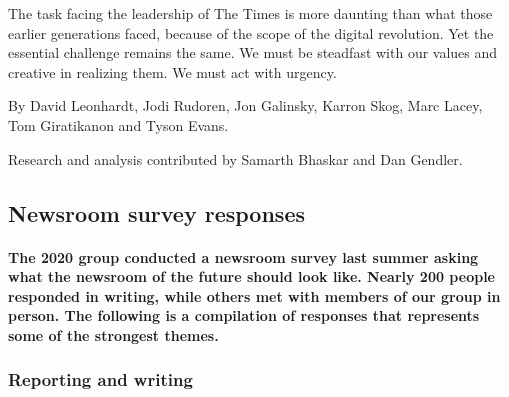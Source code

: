 The task facing the leadership of The Times is more daunting than what
those earlier generations faced, because of the scope of the digital
revolution. Yet the essential challenge remains the same. We must be
steadfast with our values and creative in realizing them. We must act
with urgency.

By David Leonhardt, Jodi Rudoren, Jon Galinsky, Karron Skog, Marc Lacey,
Tom Giratikanon and Tyson Evans.

Research and analysis contributed by Samarth Bhaskar and Dan Gendler.

\hypertarget{newsroom-survey-responses}{%
\subsection{Newsroom survey responses}\label{newsroom-survey-responses}}

\hypertarget{the-2020-group-conducted-a-newsroom-survey-last-summer-asking-what-the-newsroom-of-the-future-should-look-like-nearly-200-people-responded-in-writing-while-others-met-with-members-of-our-group-in-person-the-following-is-a-compilation-of-responses-that-represents-some-of-the-strongest-themes}{%
\paragraph{The 2020 group conducted a newsroom survey last summer asking
what the newsroom of the future should look like. Nearly 200 people
responded in writing, while others met with members of our group in
person. The following is a compilation of responses that represents some
of the strongest
themes.}\label{the-2020-group-conducted-a-newsroom-survey-last-summer-asking-what-the-newsroom-of-the-future-should-look-like-nearly-200-people-responded-in-writing-while-others-met-with-members-of-our-group-in-person-the-following-is-a-compilation-of-responses-that-represents-some-of-the-strongest-themes}}

\hypertarget{reporting-and-writing}{%
\subsubsection{Reporting and writing}\label{reporting-and-writing}}

